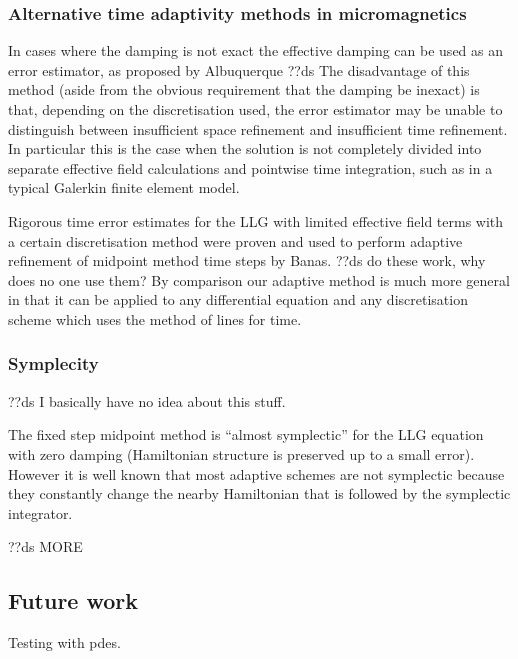 \subsubsection{Alternative time adaptivity methods in micromagnetics}
\label{sec:altern-time-adapt}

In cases where the damping is not exact the effective damping can be used as an error estimator, as proposed by Albuquerque \etal\cite{Albuquerque2001}
??ds The disadvantage of this method (aside from the obvious requirement that the damping be inexact) is that, depending on the discretisation used, the error estimator may be unable to distinguish between insufficient space refinement and insufficient time refinement.
In particular this is the case when the solution is not completely divided into separate effective field calculations and pointwise time integration, such as in a typical Galerkin finite element model.

Rigorous time error estimates for the LLG with limited effective field terms with a certain discretisation method were proven and used to perform adaptive refinement of midpoint method time steps by Banas.\cite{Banas-thesis} ??ds do these work, why does no one use them?
By comparison our adaptive method is much more general in that it can be applied to any differential equation and any discretisation scheme which uses the method of lines for time.

\subsubsection{Symplecity}

??ds I basically have no idea about this stuff.

The fixed step midpoint method is ``almost symplectic'' for the LLG equation with zero damping (Hamiltonian structure is preserved up to a small error).\cite{Austin1993}
However it is well known that most adaptive schemes are not symplectic\cite{Iserles2009} %
because they constantly change the nearby Hamiltonian that is followed by the symplectic integrator.

??ds MORE


\subsection{Future work}


Testing with pdes.



